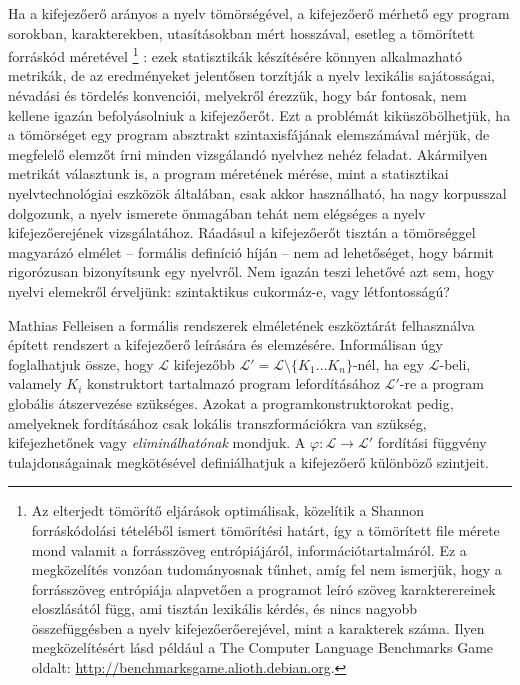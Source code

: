 Ha a kifejezőerő arányos a nyelv tömörségével, a kifejezőerő mérhető egy program sorokban, karakterekben, utasításokban mért hosszával, esetleg a tömörített forráskód méretével%
\footnote{%
Az elterjedt tömörítő eljárások optimálisak, közelítik a Shannon forráskódolási tételéből ismert tömörítési határt, így a tömörített file mérete mond valamit a forrásszöveg entrópiájáról, információtartalmáról.
Ez a megközelítés vonzóan tudományosnak tűnhet, amíg fel nem ismerjük, hogy a forrásszöveg entrópiája alapvetően a programot leíró szöveg karakterereinek eloszlásától függ, ami tisztán lexikális kérdés, és nincs nagyobb összefüggésben a nyelv kifejezőerőerejével, mint a karakterek száma.
Ilyen megközelítésért lásd például a The Computer Language Benchmarks Game oldalt: \url{http://benchmarksgame.alioth.debian.org}.
}%
: ezek statisztikák készítésére könnyen alkalmazható metrikák, de az eredményeket jelentősen torzítják a nyelv lexikális sajátosságai, névadási és tördelés konvenciói, melyekről érezzük, hogy bár fontosak, nem kellene igazán befolyásolniuk a kifejezőerőt.
Ezt a problémát kiküszöbölhetjük, ha a tömörséget egy program absztrakt szintaxisfájának elemszámával mérjük, de megfelelő elemzőt írni minden vizsgálandó nyelvhez nehéz feladat.
Akármilyen metrikát választunk is, a program méretének mérése, mint a statisztikai nyelvtechnológiai eszközök általában, csak akkor használható, ha nagy korpusszal dolgozunk, a nyelv ismerete önmagában tehát nem elégséges a nyelv kifejezőerejének vizsgálatához.
Ráadásul a kifejezőerőt tisztán a tömörséggel magyarázó elmélet -- formális definíció híján -- nem ad lehetőséget, hogy bármit rigorózusan bizonyítsunk egy nyelvről.
Nem igazán teszi lehetővé azt sem, hogy nyelvi elemekről érveljünk: szintaktikus cukormáz-e, vagy létfontosságú?

Mathias Felleisen a formális rendszerek elméletének eszköztárát felhasználva épített rendszert a kifejezőerő leírására és elemzésére\cite{Felleisen90}.
Informálisan úgy foglalhatjuk össze, hogy $\mathcal{L}$ kifejezőbb $\mathcal{L}' = \mathcal{L} \setminus \{K_1 \ldots K_n\}$-nél, ha egy $\mathcal{L}$-beli, valamely $K_i$ konstruktort tartalmazó program lefordításához $\mathcal{L}'$-re a program globális átszervezése szükséges.
Azokat a programkonstruktorokat pedig, amelyeknek fordításához csak lokális transzformációkra van szükség, kifejezhetőnek vagy \textit{eliminálhatónak} mondjuk.
A $\varphi: \mathcal{L} \rightarrow \mathcal{L}'$ fordítási függvény tulajdonságainak megkötésével definiálhatjuk a kifejezőerő különböző szintjeit. %

